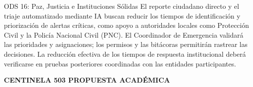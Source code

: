 \documentclass[10pt,letterpaper]{article}
\newcommand{\sectionicon}[1]{\textcolor{cyan}{#1}\enspace}
\begin{document}
\begin{techbox}{\sectionicon{\faUsers}ODS 16: Paz, Justicia e Instituciones Sólidas}
\small\justifying
El reporte ciudadano directo y el triaje automatizado mediante IA buscan reducir los tiempos de identificación y priorización de alertas críticas, como apoyo a autoridades locales como Protección Civil y la Policía Nacional Civil (PNC). El Coordinador de Emergencia validará las prioridades y asignaciones; los permisos y las bitácoras permitirán rastrear las decisiones. La reducción efectiva de los tiempos de respuesta institucional deberá verificarse en pruebas posteriores coordinadas con las entidades participantes.
\end{techbox}

\vfill
\noindent
{\footnotesize\color{cyan}\bfseries CENTINELA 503 \hfill PROPUESTA ACADÉMICA}
\end{document}
